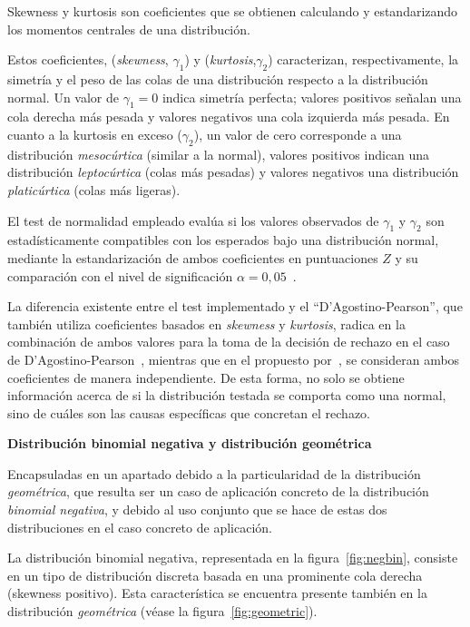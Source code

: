  Skewness y kurtosis son coeficientes que se obtienen calculando y estandarizando los momentos centrales
 de una distribución.

 Estos coeficientes, (\textit{skewness}, $\gamma_1$) y (\textit{kurtosis},$\gamma_2$) 
  caracterizan, respectivamente, la simetría y el peso de las colas de una distribución respecto a 
  la distribución normal. Un valor de $\gamma_1 = 0$ indica simetría perfecta; valores 
positivos señalan una cola derecha más pesada y valores negativos una cola izquierda más pesada. En cuanto a
 la kurtosis en exceso ($\gamma_2$), un valor de cero corresponde a una distribución \textit{mesocúrtica} (similar a
  la normal), valores positivos indican una distribución \textit{leptocúrtica} (colas más pesadas) y valores negativos una
  distribución \textit{platicúrtica} (colas más ligeras).

El test de normalidad empleado evalúa si los valores observados de $\gamma_1$ y $\gamma_2$ son estadísticamente 
compatibles con los esperados bajo una distribución normal, mediante la estandarización de ambos coeficientes 
en puntuaciones $Z$ y su comparación con el nivel de significación $\alpha = 0{,}05$~\cite{kim2013normality}.

La diferencia existente entre el test implementado y el \enquote{D'Agostino-Pearson}, que también utiliza
coeficientes basados en \textit{skewness} y \textit{kurtosis}, radica en la combinación de ambos valores
para la toma de la decisión de rechazo en el caso de D'Agostino-Pearson~\cite{dagostino1973tests}, mientras que 
en el propuesto por~\textcite{kim2013normality}, se consideran ambos coeficientes de manera independiente. 
De esta forma, no solo se obtiene información acerca de si la distribución testada se comporta como una normal,
 sino de cuáles son las causas específicas que concretan el rechazo.

\medskip
\noindent\textbf{Distribución binomial negativa y distribución geométrica}

Encapsuladas en un apartado debido a la particularidad de la distribución \textit{geométrica}, que resulta ser 
un caso de aplicación concreto de la distribución \textit{binomial negativa}, y debido al uso conjunto que 
se hace de estas dos distribuciones en el caso concreto de aplicación.

La distribución binomial negativa, representada en la figura~\ref{fig:negbin}, consiste en un 
tipo de distribución discreta basada en una prominente cola derecha (skewness positivo). Esta característica se
encuentra presente también en la distribución \textit{geométrica} (véase la figura~\ref{fig:geometric}).

